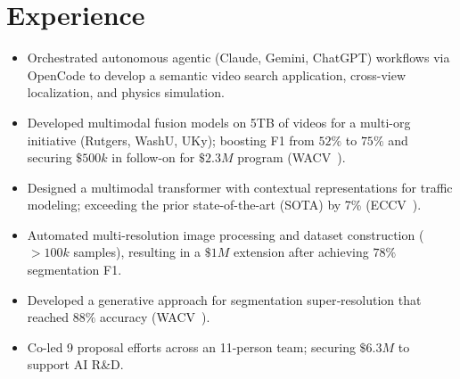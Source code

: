 \documentclass[11pt,a4paper,sans]{moderncv} %
\begin{document}

\makecvtitle %
\vspace*{-1.5cm}



\section{Experience}
{
\begin{itemize}
	\item Orchestrated autonomous agentic (Claude, Gemini, ChatGPT) workflows via OpenCode to develop a semantic video search application, cross-view localization, and physics simulation.
  \item Developed multimodal fusion models on 5TB of videos for a multi-org initiative (Rutgers, WashU, UKy); boosting F1 from $52\%$ to $75\%$ and securing $\$500k$ in follow-on for $\$2.3M$ program (WACV~\cite{greenwell2024watch}).
	\item Designed a multimodal transformer with contextual representations for traffic modeling; exceeding the prior state-of-the-art (SOTA) by 7\% (ECCV~\cite{ProbTraffic}).
  \item Automated multi-resolution image processing and dataset construction ($>100k$ samples), resulting in a $\$1M$ extension after achieving $78\%$ segmentation F1.
	\item Developed a generative approach for segmentation super‑resolution that reached $88\%$ accuracy (WACV~\cite{Low2High}).
  \item Co-led 9 proposal efforts across an 11-person team; securing $\$6.3M$ to support AI R\&D.
\end{itemize}
}
\end{document}
